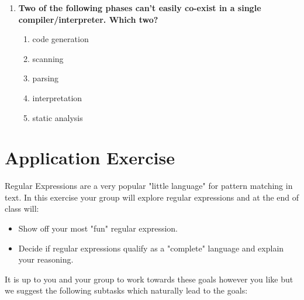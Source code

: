 \documentclass[twoside=false, DIV=14]{scrartcl}
\begin{document}
\begin{enumerate}
\item \textbf{Two of the following phases can't easily co-exist in a single compiler/interpreter.  Which two?}
\begin{enumerate}
  \item code generation \tick
  \item scanning
  \item parsing
  \item interpretation \tick
  \item static analysis
\end{enumerate}
\end{enumerate}

\newpage
\part*{Application Exercise}
Regular Expressions are a very popular "little language" for pattern matching in text.  In this exercise your group will explore regular expressions and at the end of class will:
\begin{itemize}
  \item Show off your most "fun" regular expression.
  \item Decide if regular expressions qualify as a "complete" language and explain your reasoning.
\end{itemize}
It is up to you and your group to work towards these goals however you like but we suggest the following subtasks which naturally lead to the goals:
\end{document}
